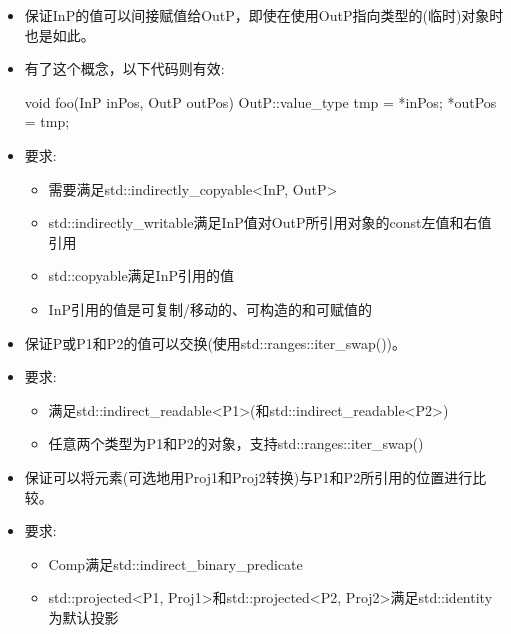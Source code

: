 \begin{itemize}
\item
保证InP的值可以间接赋值给OutP，即使在使用OutP指向类型的(临时)对象时也是如此。

\item
有了这个概念，以下代码则有效:

\begin{cpp}
void foo(InP inPos, OutP outPos) {
	OutP::value_type tmp = *inPos;
	*outPos = tmp;
}
\end{cpp}

\item
要求:
\begin{itemize}
\item
需要满足std::indirectly\_copyable<InP, OutP> 

\item
std::indirectly\_writable满足InP值对OutP所引用对象的const左值和右值引用

\item
std::copyable满足InP引用的值

\item
InP引用的值是可复制/移动的、可构造的和可赋值的
\end{itemize}
\end{itemize}


\begin{itemize}
\item
保证P或P1和P2的值可以交换(使用std::ranges::iter\_swap())。

\item
要求:
\begin{itemize}
\item
满足std::indirect\_readable<P1>(和std::indirect\_readable<P2>)

\item
任意两个类型为P1和P2的对象，支持std::ranges::iter\_swap()
\end{itemize}
\end{itemize}


\begin{itemize}
\item
保证可以将元素(可选地用Proj1和Proj2转换)与P1和P2所引用的位置进行比较。

\item
要求:
\begin{itemize}
\item
Comp满足std::indirect\_binary\_predicate

\item
std::projected<P1, Proj1>和std::projected<P2, Proj2>满足std::identity为默认投影
\end{itemize}
\end{itemize}

